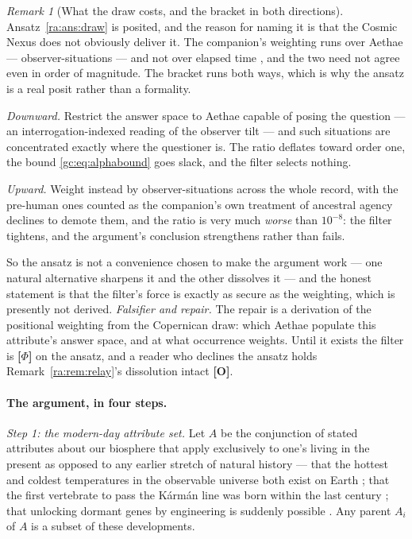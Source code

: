 \documentclass[11pt]{article}
\numberwithin{equation}{section}
\theoremstyle{plain}
\theoremstyle{definition}
\theoremstyle{remark}
\newtheorem{remark}[theorem]{Remark}
\begin{document}
\begin{remark}[What the draw costs, and the bracket in both directions]
\label{ra:rem:drawcost}
Ansatz~\ref{ra:ans:draw} is posited, and the reason for naming it is
that the Cosmic Nexus does not obviously deliver it. The companion's
weighting runs over Aethae --- observer-situations --- and not over
elapsed time \cite{Nexus, NexicFoundation}, and the two need not agree
even in order of magnitude. The bracket runs both ways, which is why
the ansatz is a real posit rather than a formality.

\emph{Downward.} Restrict the answer space to Aethae capable of posing
the question --- an interrogation-indexed reading of the observer tilt
--- and such situations are concentrated exactly where the questioner
is. The ratio deflates toward order one, the bound
\eqref{gc:eq:alphabound} goes slack, and the filter selects nothing.

\emph{Upward.} Weight instead by observer-situations across the whole
record, with the pre-human ones counted as the companion's own
treatment of ancestral agency declines to demote them, and the ratio
is very much \emph{worse} than $10^{-8}$: the filter tightens, and the
argument's conclusion strengthens rather than fails.

So the ansatz is not a convenience chosen to make the argument work ---
one natural alternative sharpens it and the other dissolves it --- and
the honest statement is that the filter's force is exactly as secure as
the weighting, which is presently not derived. \emph{Falsifier and
repair.} The repair is a derivation of the positional weighting from
the Copernican draw: which Aethae populate this attribute's answer
space, and at what occurrence weights. Until it exists the filter is
\textbf{[$\Phi$]} on the ansatz, and a reader who declines the ansatz
holds Remark~\ref{ra:rem:relay}'s dissolution intact \textbf{[O]}.
\end{remark}

\paragraph{The argument, in four steps.}

\emph{Step 1: the modern-day attribute set.} Let $A$ be the conjunction
of stated attributes about our biosphere that apply exclusively to
one's living in the present as opposed to any earlier stretch of natural
history --- that the hottest and coldest temperatures in the observable
universe both exist on Earth
\cite{ALICE2012Temperature,Kovachy2015Picokelvin}; that the first
vertebrate to pass the K\'arm\'an line was born within the last century
\cite{burgess2007animals}; that unlocking dormant genes by engineering is
suddenly possible \cite{Pattali2026_CRISPR_epigenome_mod}. Any parent
$A_i$ of $A$ is a subset of these developments.
\end{document}
